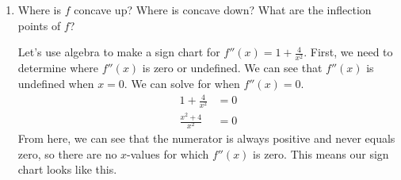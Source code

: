 \documentclass{article}
\begin{document}
\begin{enumerate}
\begin{enumerate}
    \begin{solution}
      Since $f''$ is the derivative of $f'$, let's write down the definition of the derivative.
      \begin{align*}
        f''(x) &= \lim_{h \to 0} \frac{f'(x+h)-f'(x)}{h} \\
        &= \lim_{h \to 0} \frac{x+h -\frac{4}{x+h} - \bigl(x - \frac{4}{x}\bigr)}{h} \\
        &= \lim_{h \to 0} \frac{h - \frac{4}{x+h} + \frac{4}{x}}{h} \\
        \intertext{Now let's rewrite the complex fraction a bit.}
        &= \lim_{h \to 0} \left(h-\frac{4}{x+h} + \frac{4}{x}\right)\cdot \frac{1}{h} \\
        &= \lim_{h \to 0} \left(h-\frac{4x}{x(x+h)} + \frac{4(x+h)}{x(x+h)}\right)\cdot \frac{1}{h} \\
        &= \lim_{h \to 0} \left(h+\frac{-4x+4(x+h)}{x(x+h)}\right)\cdot \frac{1}{h} \\
        &= \lim_{h \to 0} \left(h+\frac{4h}{x(x+h)}\right)\cdot \frac{1}{h} \\
        \intertext{Now we can cancel the $h$'s and evaluate the limit.}
        &= \lim_{h \to 0} \left( 1 + \frac{4}{x(x+h)}\right) \\
        &= 1 - \frac{-4}{x(x+0)} \\
        &= \boxed{1 + \frac{4}{x^2}}
      \end{align*}
    \end{solution}

  \item


    \begin{problem}[\vfill]
      Where is $f$ concave up? Where is concave down? What are the inflection points of $f$? 
    \end{problem}

    \begin{solution}
      Let's use algebra to make a sign chart for $f''(x)=1+\frac{4}{x^2}$. First, we need to determine
      where $f''(x)$ is zero or undefined. We can see that $f''(x)$ is undefined when $x=0$. We can solve
      for when $f''(x)=0$. 
      \begin{align*}
        1+\frac{4}{x^2} &= 0 \\
        \frac{x^2 + 4}{x^2} &= 0
      \end{align*}
      From here, we can see that the numerator is always positive and never equals zero, so there are no $x$-values
      for which $f''(x)$ is zero. This means our sign chart looks like this.
      

\end{solution}
\end{enumerate}
\end{enumerate}
\end{document}

